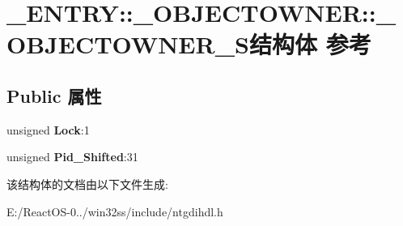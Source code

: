 \hypertarget{struct___e_n_t_r_y_1_1___o_b_j_e_c_t_o_w_n_e_r_1_1___o_b_j_e_c_t_o_w_n_e_r___s}{}\section{\+\_\+\+E\+N\+T\+RY\+:\+:\+\_\+\+O\+B\+J\+E\+C\+T\+O\+W\+N\+ER\+:\+:\+\_\+\+O\+B\+J\+E\+C\+T\+O\+W\+N\+E\+R\+\_\+\+S结构体 参考}
\label{struct___e_n_t_r_y_1_1___o_b_j_e_c_t_o_w_n_e_r_1_1___o_b_j_e_c_t_o_w_n_e_r___s}
\subsection*{Public 属性}
\begin{DoxyCompactItemize}
\item 
\mbox{\label{struct___e_n_t_r_y_1_1___o_b_j_e_c_t_o_w_n_e_r_1_1___o_b_j_e_c_t_o_w_n_e_r___s_aa523f44b31f2ce9b6c6085fdcac1ef16}} 
unsigned {\bfseries Lock}\+:1
\item 
\mbox{\label{struct___e_n_t_r_y_1_1___o_b_j_e_c_t_o_w_n_e_r_1_1___o_b_j_e_c_t_o_w_n_e_r___s_a9b99e348d487919e55d4a971f15d5017}} 
unsigned {\bfseries Pid\+\_\+\+Shifted}\+:31
\end{DoxyCompactItemize}


该结构体的文档由以下文件生成\+:\begin{DoxyCompactItemize}
\item 
E\+:/\+React\+O\+S-\/0../win32ss/include/ntgdihdl.\+h\end{DoxyCompactItemize}
